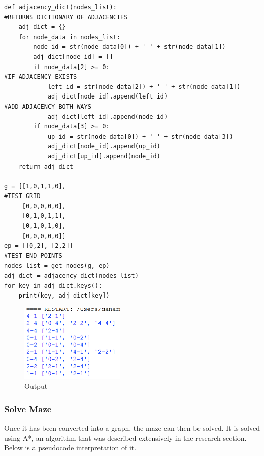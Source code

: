 \documentclass[titlepage]{article}
\begin{document}
\begin{changemargin}{-1in}{-1in} 
\begin{verbatim}
def adjacency_dict(nodes_list):                                                 #RETURNS DICTIONARY OF ADJACENCIES
    adj_dict = {}
    for node_data in nodes_list:
        node_id = str(node_data[0]) + '-' + str(node_data[1])
        adj_dict[node_id] = []  
        if node_data[2] >= 0:                                                   #IF ADJACENCY EXISTS
            left_id = str(node_data[2]) + '-' + str(node_data[1])
            adj_dict[node_id].append(left_id)                                   #ADD ADJACENCY BOTH WAYS
            adj_dict[left_id].append(node_id)
        if node_data[3] >= 0:
            up_id = str(node_data[0]) + '-' + str(node_data[3])
            adj_dict[node_id].append(up_id)
            adj_dict[up_id].append(node_id)
    return adj_dict

g = [[1,0,1,1,0],                                                               #TEST GRID
     [0,0,0,0,0],
     [0,1,0,1,1],
     [0,1,0,1,0],
     [0,0,0,0,0]]
ep = [[0,2], [2,2]]                                                             #TEST END POINTS
nodes_list = get_nodes(g, ep)
adj_dict = adjacency_dict(nodes_list)
for key in adj_dict.keys():
    print(key, adj_dict[key])
\end{verbatim}
\end{changemargin} 

\begin{figure}[H]
  \centering
  \includegraphics[width=5cm]{adjout.png}
  \caption{Output}
  \label{fig:dijk}
\end{figure}

\subsubsection{Solve Maze}
Once it has been converted into a graph, the maze can then be solved. It is solved using A*, an algorithm that was described extensively in the research section. Below is a pseudocode interpretation of it.
\end{document}
